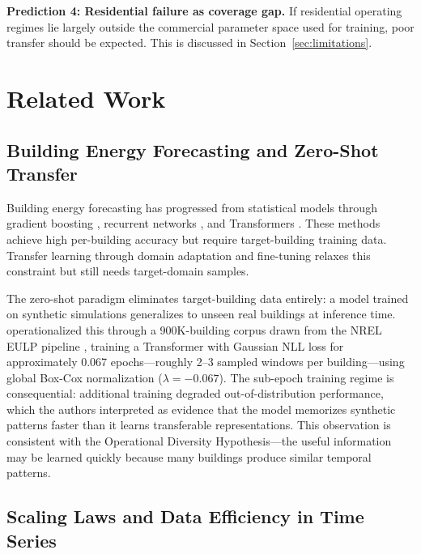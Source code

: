 \documentclass[preprint,12pt,authoryear]{elsarticle}
\begin{document}
\textbf{Prediction 4: Residential failure as coverage gap.} If residential operating regimes lie largely outside the commercial parameter space used for training, poor transfer should be expected. This is discussed in Section~\ref{sec:limitations}.

\section{Related Work}
\label{sec:related}

\subsection{Building Energy Forecasting and Zero-Shot Transfer}

Building energy forecasting has progressed from statistical models \citep{Amasyali2018} through gradient boosting \citep{Chen2016}, recurrent networks \citep{Hochreiter1997}, and Transformers \citep{Vaswani2017,Nie2023}. These methods achieve high per-building accuracy but require target-building training data. Transfer learning through domain adaptation \citep{Ribeiro2018} and fine-tuning \citep{Spencer2025} relaxes this constraint but still needs target-domain samples.

The zero-shot paradigm eliminates target-building data entirely: a model trained on synthetic simulations generalizes to unseen real buildings at inference time. \citet{Emami2023} operationalized this through a 900K-building corpus drawn from the NREL EULP pipeline \citep{Wilson2022}, training a Transformer with Gaussian NLL loss for approximately 0.067 epochs---roughly 2--3 sampled windows per building---using global Box-Cox normalization ($\lambda = -0.067$). The sub-epoch training regime is consequential: additional training degraded out-of-distribution performance, which the authors interpreted as evidence that the model memorizes synthetic patterns faster than it learns transferable representations. This observation is consistent with the Operational Diversity Hypothesis---the useful information may be learned quickly because many buildings produce similar temporal patterns.

\subsection{Scaling Laws and Data Efficiency in Time Series}
\end{document}
